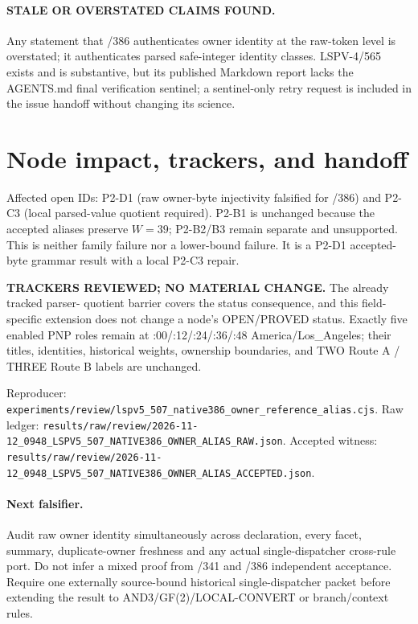 \documentclass[11pt]{article}
\begin{document}
\paragraph{STALE OR OVERSTATED CLAIMS FOUND.} Any statement that /386 authenticates
owner identity at the raw-token level is overstated; it authenticates parsed
safe-integer identity classes.  LSPV-4/565 exists and is substantive, but its
published Markdown report lacks the AGENTS.md final verification sentinel; a
sentinel-only retry request is included in the issue handoff without changing
its science.

\section{Node impact, trackers, and handoff}

Affected open IDs: P2-D1 (raw owner-byte injectivity falsified for /386) and
P2-C3 (local parsed-value quotient required).  P2-B1 is unchanged because the
accepted aliases preserve $W=39$; P2-B2/B3 remain separate and unsupported.
This is neither family failure nor a lower-bound failure.  It is a P2-D1
accepted-byte grammar result with a local P2-C3 repair.

\textbf{TRACKERS REVIEWED; NO MATERIAL CHANGE.} The already tracked parser-
quotient barrier covers the status consequence, and this field-specific
extension does not change a node's OPEN/PROVED status.  Exactly five enabled PNP
roles remain at :00/:12/:24/:36/:48 America/Los\_Angeles; their titles,
identities, historical weights, ownership boundaries, and TWO Route A / THREE
Route B labels are unchanged.

Reproducer:
\texttt{experiments/review/lspv5\_507\_native386\_owner\_reference\_alias.cjs}.
Raw ledger:
\texttt{results/raw/review/2026-11-12\_0948\_LSPV5\_507\_NATIVE386\_OWNER\_ALIAS\_RAW.json}.
Accepted witness:
\texttt{results/raw/review/2026-11-12\_0948\_LSPV5\_507\_NATIVE386\_OWNER\_ALIAS\_ACCEPTED.json}.

\paragraph{Next falsifier.} Audit raw owner identity simultaneously across
declaration, every facet, summary, duplicate-owner freshness and any actual
single-dispatcher cross-rule port.  Do not infer a mixed proof from /341 and
/386 independent acceptance.  Require one externally source-bound historical
single-dispatcher packet before extending the result to AND3/GF(2)/LOCAL-CONVERT
or branch/context rules.

\end{document}
